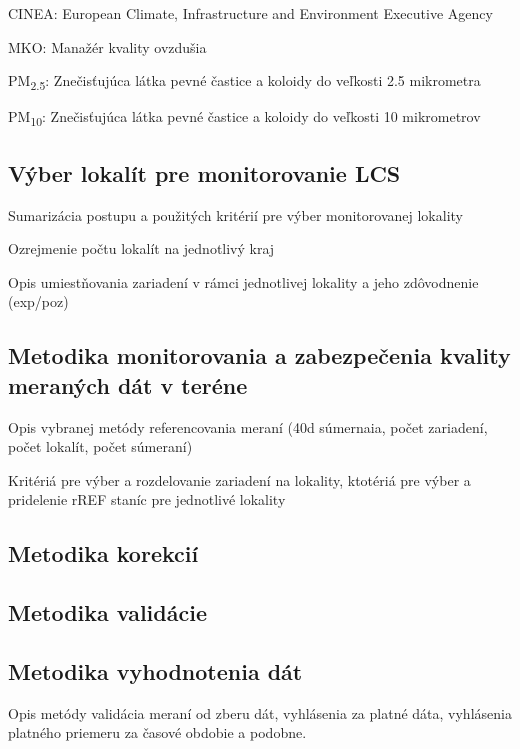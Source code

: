 \documentclass[
  slovak,
  letterpaper,
  DIV=11,
  numbers=noendperiod]{scrartcl}
\begin{document}
CINEA: European Climate, Infrastructure and Environment Executive Agency

MKO: Manažér kvality ovzdušia

PM\textsubscript{2.5}: Znečisťujúca látka pevné častice a koloidy do
veľkosti 2.5 mikrometra

PM\textsubscript{10}: Znečisťujúca látka pevné častice a koloidy do
veľkosti 10 mikrometrov

\subsection{Výber lokalít pre monitorovanie
LCS}\label{vuxfdber-lokaluxedt-pre-monitorovanie-lcs}

Sumarizácia postupu a použitých kritérií pre výber monitorovanej
lokality

Ozrejmenie počtu lokalít na jednotlivý kraj

Opis umiestňovania zariadení v rámci jednotlivej lokality a jeho
zdôvodnenie (exp/poz)

\subsection{Metodika monitorovania a zabezpečenia kvality meraných dát v
teréne}\label{metodika-monitorovania-a-zabezpeux10denia-kvality-meranuxfdch-duxe1t-v-teruxe9ne}

Opis vybranej metódy referencovania meraní (40d súmernaia, počet
zariadení, počet lokalít, počet súmeraní)

Kritériá pre výber a rozdelovanie zariadení na lokality, ktotériá pre
výber a pridelenie rREF staníc pre jednotlivé lokality

\subsection{Metodika korekcií}\label{metodika-korekciuxed}

\subsection{Metodika validácie}\label{metodika-validuxe1cie}

\subsection{Metodika vyhodnotenia
dát}\label{metodika-vyhodnotenia-duxe1t}

Opis metódy validácia meraní od zberu dát, vyhlásenia za platné dáta,
vyhlásenia platného priemeru za časové obdobie a podobne.
\end{document}

